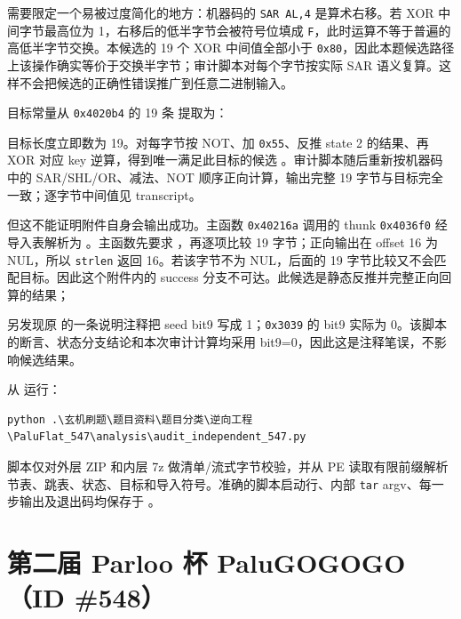 需要限定一个易被过度简化的地方：机器码的 \texttt{SAR\ AL,4} 是算术右移。若 XOR 中间字节最高位为 1，右移后的低半字节会被符号位填成 \texttt{F}，此时运算不等于普遍的高低半字节交换。本候选的 19 个 XOR 中间值全部小于 \texttt{0x80}，因此本题候选路径上该操作确实等价于交换半字节；审计脚本对每个字节按实际 SAR 语义复算。这样不会把候选的正确性错误推广到任意二进制输入。

目标常量从 \texttt{0x4020b4} 的 19 条 \texttt{} 提取为：

\texttt{}

目标长度立即数为 19。对每字节按 NOT、加 \texttt{0x55}、反推 state 2 的结果、再 XOR 对应 key 逆算，得到唯一满足此目标的候选 \texttt{}。审计脚本随后重新按机器码中的 SAR/SHL/OR、减法、NOT 顺序正向计算，输出完整 19 字节与目标完全一致；逐字节中间值见 transcript。

但这不能证明附件自身会输出成功。主函数 \texttt{0x40216a} 调用的 thunk \texttt{0x4036f0} 经导入表解析为 \texttt{}。主函数先要求 \texttt{}，再逐项比较 19 字节；正向输出在 offset 16 为 NUL，所以 \texttt{strlen} 返回 16。若该字节不为 NUL，后面的 19 字节比较又不会匹配目标。因此这个附件内的 success 分支不可达。此候选是静态反推并完整正向回算的结果；

另发现原 \texttt{} 的一条说明注释把 seed bit9 写成 1；\texttt{0x3039} 的 bit9 实际为 0。该脚本的断言、状态分支结论和本次审计计算均采用 bit9=0，因此这是注释笔误，不影响候选结果。

从 \texttt{} 运行：

\begin{verbatim}
python .\玄机刷题\题目资料\题目分类\逆向工程\PaluFlat_547\analysis\audit_independent_547.py
\end{verbatim}

脚本仅对外层 ZIP 和内层 7z 做清单/流式字节校验，并从 PE 读取有限前缀解析节表、跳表、状态、目标和导入符号。准确的脚本启动行、内部 \texttt{tar} argv、每一步输出及退出码均保存于 \texttt{}。

\section{第二届 Parloo 杯 PaluGOGOGO（ID \#548）}\label{ux7b2cux4e8cux5c4a-parloo-ux676f-palugogogoid-548}

